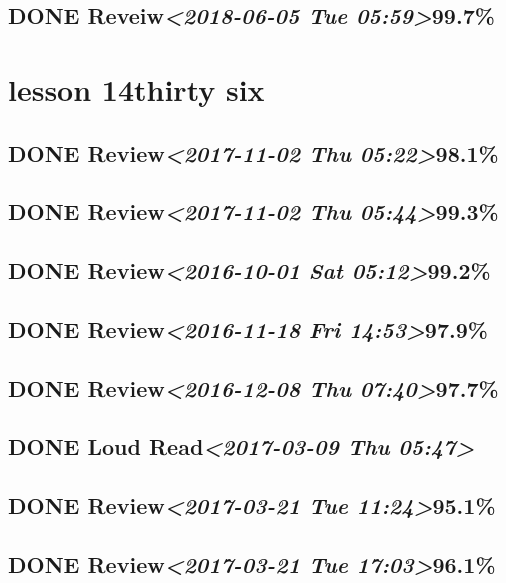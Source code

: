 \documentclass[11pt]{ctexart}
\begin{document}
\subsection{{\bfseries\sffamily DONE} Reveiw\textit{<2018-06-05 Tue 05:59>}99.7\%}
\label{sec:org0605156}
\section{lesson 14thirty six}
\label{sec:orgc250ad3}
\subsection{{\bfseries\sffamily DONE} Review\textit{<2017-11-02 Thu 05:22>}98.1\%}
\label{sec:org0951c17}
\subsection{{\bfseries\sffamily DONE} Review\textit{<2017-11-02 Thu 05:44>}99.3\%}
\label{sec:org319f98c}
\subsection{{\bfseries\sffamily DONE} Review\textit{<2016-10-01 Sat 05:12>}99.2\%}
\label{sec:org004243d}
\subsection{{\bfseries\sffamily DONE} Review\textit{<2016-11-18 Fri 14:53>}97.9\%}
\label{sec:orgd92677d}
\subsection{{\bfseries\sffamily DONE} Review\textit{<2016-12-08 Thu 07:40>}97.7\%}
\label{sec:orgd77f15a}
\subsection{{\bfseries\sffamily DONE} Loud Read\textit{<2017-03-09 Thu 05:47>}}
\label{sec:org3938dfa}
\subsection{{\bfseries\sffamily DONE} Review\textit{<2017-03-21 Tue 11:24>}95.1\%}
\label{sec:orgee2614b}
\subsection{{\bfseries\sffamily DONE} Review\textit{<2017-03-21 Tue 17:03>}96.1\%}
\label{sec:orga5f55da}
\end{document}
